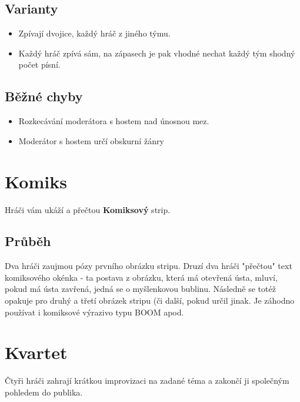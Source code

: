 \documentclass[main.tex]{subfiles}
\begin{document}
\subsection{ Varianty } \begin{itemize}
\item Zpívají dvojice, každý hráč z jiného týmu.
\item Každý hráč zpívá sám, na zápasech je pak vhodné nechat každý tým shodný počet písní.
\end{itemize}
  
 
\subsection{ Běžné chyby } \begin{itemize}
\item Rozkecávání moderátora s hostem nad únosnou mez.
\item Moderátor s hostem určí obskurní žánry
\end{itemize}
 
 
 
 
 
\needspace{5cm} \section{Komiks} \label{komiks}  
 
Hráči vám ukáží a přečtou \textbf{Komiksový}{} strip. 
 
\subsection{Průběh} Dva hráči zaujmou pózy prvního obrázku stripu. 
Druzí dva hráči "přečtou"{} text komiksového okénka - ta postava z obrázku, která má otevřená ústa, mluví, pokud má ústa zavřená, jedná se o myšlenkovou bublinu. 
Následně se totéž opakuje pro druhý a třetí obrázek stripu (či další, pokud  určil jinak. 
Je záhodno používat i komiksové výrazivo typu BOOM apod. 
 
 
 
 
\needspace{5cm} \section{Kvartet} \label{kvartet}  
 
 
Čtyři hráči zahrají krátkou improvizaci na zadané téma a zakončí ji společným pohledem do publika. 
 
\end{document}

